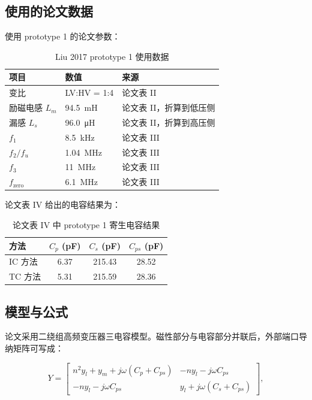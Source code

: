 \documentclass[UTF8,a4paper,12pt]{ctexart}
\begin{document}
\subsection{使用的论文数据}

使用 prototype 1 的论文参数：

\begin{table}[H]
\centering
\caption{Liu 2017 prototype 1 使用数据}
\begin{tabular}{lll}
\toprule
项目 & 数值 & 来源 \\
\midrule
变比 & LV:HV = 1:4 & 论文表 II \\
励磁电感 $L_m$ & \SI{94.5}{mH} & 论文表 II，折算到低压侧 \\
漏感 $L_s$ & \SI{96.0}{\micro H} & 论文表 II，折算到高压侧 \\
$f_1$ & \SI{8.5}{kHz} & 论文表 III \\
$f_2/f_u$ & \SI{1.04}{MHz} & 论文表 III \\
$f_3$ & \SI{11}{MHz} & 论文表 III \\
$f_{\mathrm{zero}}$ & \SI{6.1}{MHz} & 论文表 III \\
\bottomrule
\end{tabular}
\end{table}

论文表 IV 给出的电容结果为：

\begin{table}[H]
\centering
\caption{论文表 IV 中 prototype 1 寄生电容结果}
\begin{tabular}{lccc}
\toprule
方法 & $C_p$ (pF) & $C_s$ (pF) & $C_{ps}$ (pF) \\
\midrule
IC 方法 & 6.37 & 215.43 & 28.52 \\
TC 方法 & 5.31 & 215.59 & 28.36 \\
\bottomrule
\end{tabular}
\end{table}

\subsection{模型与公式}

论文采用二绕组高频变压器三电容模型。磁性部分与电容部分并联后，外部端口导纳矩阵可写成：

\begin{equation}
Y =
\begin{bmatrix}
n^2 y_l + y_m + j\omega(C_p+C_{ps}) & -n y_l - j\omega C_{ps} \\
-n y_l - j\omega C_{ps} & y_l + j\omega(C_s+C_{ps})
\end{bmatrix},
\end{equation}
\end{document}
